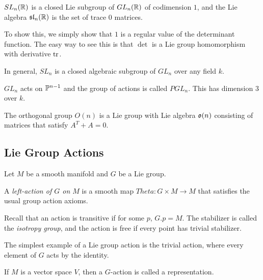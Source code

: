 \documentclass[twoside, 10pt]{article}
\begin{document}
    \begin{exm} $SL_n(\R)$ is a closed Lie subgroup of $GL_n(\R)$ of
    codimension $1$, and the Lie algebra $\mf{sl}_n(\R)$ is the set of trace
$0$ matrices.  \end{exm}

    To show this, we simply show that $1$ is a regular value of the determinant
    function. The easy way to see this is that $\det$ is a Lie group
    homomorphism with derivative $\tr$.

    \begin{exm} In general, $SL_n$ is a closed algebraic subgroup of $GL_n$
    over any field $k$.  \end{exm}

    \begin{exm} $GL_n$ acts on $\P^{n-1}$ and the group of actions is called
    $PGL_n$. This has dimension $3$ over $k$.  \end{exm}

    \begin{exm} The orthogonal group $O(n)$ is a Lie group with Lie algebra
    $\mf{o}(n)$ consisting of matrices that satisfy $A^T+A = 0$.  \end{exm}

    \subsection{Lie Group Actions}%
    
    Let $M$ be a smooth manifold and $G$ be a Lie group.

    \begin{defn} A \textit{left-action of $G$ on $M$} is a smooth map $Theta:G
    \times M \to M$ that satisfies the usual group action axioms.  \end{defn}

    Recall that an action is transitive if for some $p$, $G.p = M$. The
    stabilizer is called the \textit{isotropy group}, and the action is free if
    every point has trivial stabilizer.

    \begin{exm} The simplest example of a Lie group action is the trivial
    action, where every element of $G$ acts by the identity.  \end{exm}

    \begin{exm} If $M$ is a vector space $V$, then a $G$-action is called a
    representation.  \end{exm}
\end{document}
